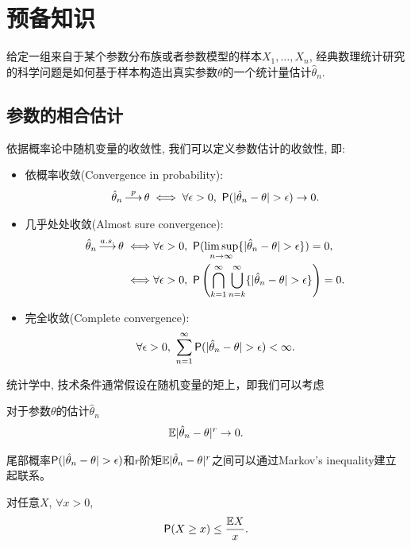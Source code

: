 \section{预备知识}
给定一组来自于某个参数分布族或者参数模型的样本$X_1,\ldots,X_n$, 经典数理统计研究的科学问题是如何基于样本构造出真实参数$\theta$的一个统计量估计$\hat{\theta}_n$.   
\subsection{参数的相合估计}
依据概率论中随机变量的收敛性, 我们可以定义参数估计的收敛性, 即:
\begin{itemize}
	\item 依概率收敛(Convergence in probability):
	\begin{align*}
		\hat{\theta}_n \topr \theta \iff \forall \epsilon>0,~\pr(|\hat{\theta}_n-\theta|>\epsilon)\to 0.
	\end{align*}
	\item 几乎处处收敛(Almost sure convergence):
	\begin{align*}
		\hat{\theta}_n \toas \theta \iff & \forall \epsilon>0,~\pr(\limsup_{n \to \infty}\{|\hat{\theta}_n-\theta|>\epsilon\})=0,\\\iff & \forall \epsilon>0,~\pr\left(\bigcap\limits_{k=1}^\infty \bigcup\limits_{n=k}^\infty \{|\hat{\theta}_n-\theta|>\epsilon\}\right)=0.
	\end{align*}
	\item 完全收敛(Complete convergence):
	\begin{align*}
		\forall \epsilon>0,~\sum_{n=1}^\infty \pr(|\hat{\theta}_n-\theta|>\epsilon)<\infty.
	\end{align*}
\end{itemize}


统计学中, 技术条件通常假设在随机变量的矩上，即我们可以考虑
\begin{defin}[$r$阶矩相合]
对于参数$\theta$的估计$\hat{\theta}_n$
\begin{align*}	
	\mathbb{E}|\hat{\theta}_n-\theta|^r \to 0.
	\end{align*}
\end{defin}
尾部概率$\pr(|\hat{\theta}_n-\theta|>\epsilon)$和$r$阶矩$\mathbb{E}|\hat{\theta}_n-\theta|^r$之间可以通过Markov's inequality建立起联系。
\begin{lem}
	对任意$X$, $\forall x >0$,
	\begin{align*}
		\textsf{P}(X \geq x) \leq \frac{\mathbb{E} X}{x}.
	\end{align*}
\end{lem}


